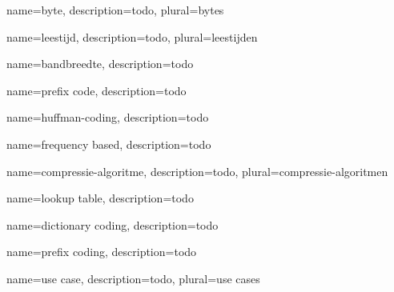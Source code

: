 {
	name={byte},
	description={todo},
	plural={bytes}
}

{
	name={leestijd},
	description={todo},
	plural={leestijden}
}

{
	name={bandbreedte},
	description={todo}
}

{
	name={prefix code},
	description={todo}
}

{
	name={huffman-coding},
	description={todo}
}

{
	name={frequency based},
	description={todo}
}

{
	name={compressie-algoritme},
	description={todo},
	plural={compressie-algoritmen}
}

{
	name={lookup table},
	description={todo}
}

{
	name={dictionary coding},
	description={todo}
}

{
	name={prefix coding},
	description={todo}
}

{
	name={use case},
	description={todo},
	plural={use cases}
}
